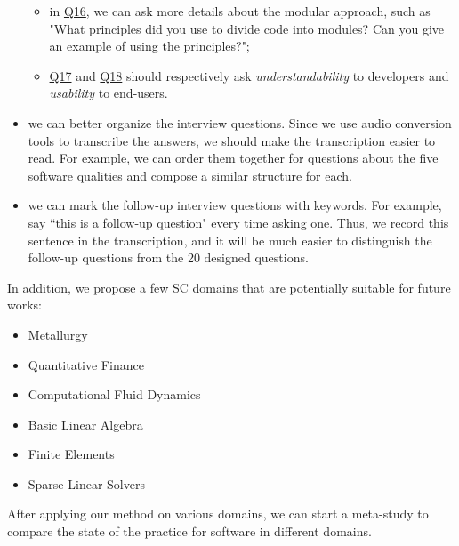 \begin{itemize}
\begin{itemize}
	    \item in \hyperlink{q16}{Q16}, we can ask more details about the modular approach, such as "What principles did you use to divide code into modules? Can you give an example of using the principles?";
	    \item \hyperlink{q17}{Q17} and  \hyperlink{q18}{Q18} should respectively ask \textit{understandability} to developers and \textit{usability} to end-users.
	\end{itemize}
	\item we can better organize the interview questions. Since we use audio conversion tools to transcribe the answers, we should make the transcription easier to read. For example, we can order them together for questions about the five software qualities and compose a similar structure for each.
	\item we can mark the follow-up interview questions with keywords. For example, say ``this is a follow-up question" every time asking one. Thus, we record this sentence in the transcription, and it will be much easier to distinguish the follow-up questions from the 20 designed questions.
\end{itemize}

\noindent In addition, we propose a few SC domains that are potentially suitable for future works:
\begin{itemize}
    \item Metallurgy
    \item Quantitative Finance
    \item Computational Fluid Dynamics
    \item Basic Linear Algebra
    \item Finite Elements
    \item Sparse Linear Solvers
\end{itemize}

\noindent After applying our method on various domains, we can start a meta-study to compare the state of the practice for software in different domains.
